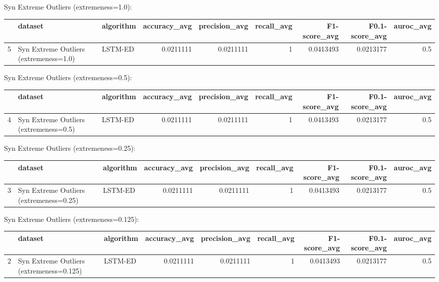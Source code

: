 Syn Extreme Outliers (extremeness=1.0):

\begin{tabular}{rllrrrrrr}
\hline
    & dataset                                & algorithm   &   accuracy\_avg &   precision\_avg &   recall\_avg &   F1-score\_avg &   F0.1-score\_avg &   auroc\_avg \\
\hline
  5 & Syn Extreme Outliers (extremeness=1.0) & LSTM-ED     &      0.0211111 &       0.0211111 &            1 &      0.0413493 &        0.0213177 &         0.5 \\
\hline
\end{tabular}

Syn Extreme Outliers (extremeness=0.5):

\begin{tabular}{rllrrrrrr}
\hline
    & dataset                                & algorithm   &   accuracy\_avg &   precision\_avg &   recall\_avg &   F1-score\_avg &   F0.1-score\_avg &   auroc\_avg \\
\hline
  4 & Syn Extreme Outliers (extremeness=0.5) & LSTM-ED     &      0.0211111 &       0.0211111 &            1 &      0.0413493 &        0.0213177 &         0.5 \\
\hline
\end{tabular}

Syn Extreme Outliers (extremeness=0.25):

\begin{tabular}{rllrrrrrr}
\hline
    & dataset                                 & algorithm   &   accuracy\_avg &   precision\_avg &   recall\_avg &   F1-score\_avg &   F0.1-score\_avg &   auroc\_avg \\
\hline
  3 & Syn Extreme Outliers (extremeness=0.25) & LSTM-ED     &      0.0211111 &       0.0211111 &            1 &      0.0413493 &        0.0213177 &         0.5 \\
\hline
\end{tabular}

Syn Extreme Outliers (extremeness=0.125):

\begin{tabular}{rllrrrrrr}
\hline
    & dataset                                  & algorithm   &   accuracy\_avg &   precision\_avg &   recall\_avg &   F1-score\_avg &   F0.1-score\_avg &   auroc\_avg \\
\hline
  2 & Syn Extreme Outliers (extremeness=0.125) & LSTM-ED     &      0.0211111 &       0.0211111 &            1 &      0.0413493 &        0.0213177 &         0.5 \\
\hline
\end{tabular}

